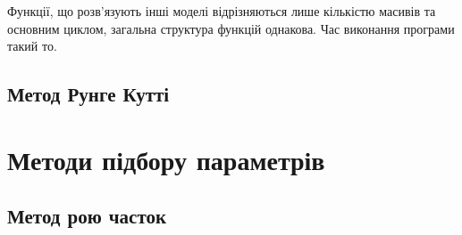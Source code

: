Функції, що розв'язують інші моделі відрізняються лише кількістю масивів та 
основним циклом, загальна структура функцій однакова. 
Час виконання програми такий то. 


\subsection{Метод Рунге Кутті}

\section{Методи підбору параметрів}


\subsection{Метод рою часток}

